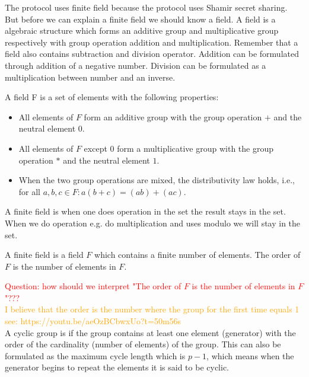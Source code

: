  The protocol uses finite field because the protocol uses Shamir secret sharing. But before we can explain a finite field we should know a field. A field is a  algebraic structure which forms an additive group and multiplicative group  respectively with group operation addition and multiplication. Remember that a field also contains subtraction and division operator. Addition can be formulated through addition of a negative number. Division can be formulated as a multiplication between number and an inverse.  
\begin{defi}
A field F is a set of elements with the following properties:
\begin{itemize}
\item  All elements of $F$ form an additive group with the group operation $+$ and the neutral element $0$.
\item  All elements of $F$ except $0$ form a multiplicative group with the group operation $*$ and the neutral element $1$.
\item When the two group operations are mixed, the distributivity law holds, i.e., for all $a,b,c \in F: a(b+c) = (ab)+(ac)$.
\end{itemize}
\end{defi}
 A finite field is when one does operation in the set the result stays in the set. When we do operation e.g. do multiplication and uses modulo we will stay in the set.
\begin{defi}
A finite field is a field $F$ which contains a finite number of elements. The order of $F$ is the number of elements in $F$.
\end{defi}
\textcolor{red}{Question: how should we interpret "The order of $F$ is the number of elements in $F$"???}\\
\textcolor{orange}{I believe that the order is the number where the group for the first time equals 1 see: https://youtu.be/aeOzBCbwxUo?t=50m56s} \\

 A cyclic group is if the group contains at least one element (generator) with the order of the cardinality (number of elements) of the group. This can also be formulated as the maximum cycle length which is $p-1$, which means when the generator begins to repeat the elements it is said to be cyclic.

